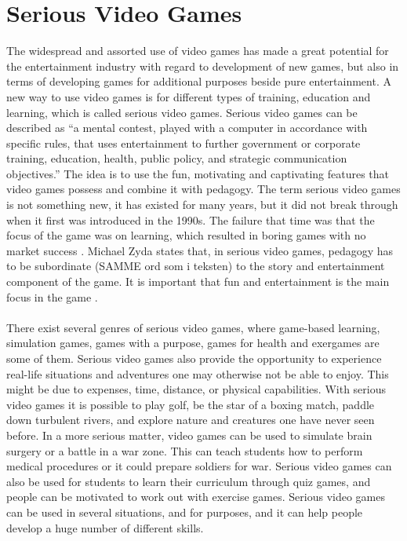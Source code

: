 \section{Serious Video Games}
The widespread and assorted use of video games has made a great potential for the entertainment industry with regard to development of new games, but also in terms of developing games for additional purposes beside pure entertainment. A new way to use video games is for different types of training, education and learning, which is called serious video games. Serious video games can be described as “a mental contest, played with a computer in accordance with specific rules, that uses entertainment to further government or corporate training, education, health, public policy, and strategic communication objectives.” \cite{zyda2005visual} The idea is to use the fun, motivating and captivating features that video games possess and combine it with pedagogy. The term serious video games is not something new, it has existed for many years, but it did not break through when it first was introduced in the 1990s. The failure that time was that the focus of the game was on learning, which resulted in boring games with no market success \cite{susi2007serious}. Michael Zyda states that, in serious video games, pedagogy has to be subordinate (SAMME ord som i teksten) to the story and entertainment component of the game. It is important that fun and entertainment is the main focus in the game \cite{zyda2005visual}. \\ \\
There exist several genres of serious video games, where game-based learning, simulation games, games with a purpose, games for health and exergames are some of them. Serious video games also provide the opportunity to experience real-life situations and adventures one may otherwise not be able to enjoy. This might be due to expenses, time, distance, or physical capabilities. With serious video games it is possible to play golf, be the star of a boxing match, paddle down turbulent rivers, and explore nature and creatures one have never seen before. In a more serious matter, video games can be used to simulate brain surgery or a battle in a war zone. This can teach students how to perform medical procedures or it could prepare soldiers for war. Serious video games can also be used for students to learn their curriculum through quiz games, and people can be motivated to work out with exercise games. Serious video games can be used in several situations, and for purposes, and it can help people develop a huge number of different skills. \\ \\
